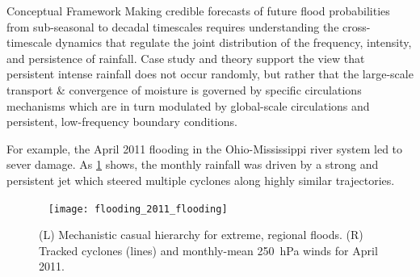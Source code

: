 \begin{block}{Conceptual Framework}
    Making credible forecasts of future flood probabilities from sub-seasonal to decadal timescales \cite{Merz2014} requires understanding the cross-timescale dynamics that regulate the joint distribution of the frequency, intensity, and persistence of rainfall.
    Case study \cite[\ie][]{Grams2014} and theory support the view that persistent intense rainfall does not occur randomly, but rather that the large-scale transport \& convergence of moisture is governed by specific circulations mechanisms which are in turn modulated by global-scale circulations and persistent, low-frequency boundary conditions.

    For example, the April 2011 flooding in the Ohio-Mississippi river system led to sever damage.
    As \cref{fig:apr2011} shows, the monthly rainfall was driven by a strong and persistent jet which steered multiple cyclones along highly similar trajectories.
    \begin{figure}
        ~\hfill
        \texttt{[image: flooding\_2011\_flooding]}
        \caption{(L) Mechanistic casual hierarchy for extreme, regional floods. (R) Tracked cyclones (lines) and monthly-mean \SI{250}{\hecto\pascal} winds for April 2011.}
        \label{fig:apr2011}
    \end{figure}
\end{block}
